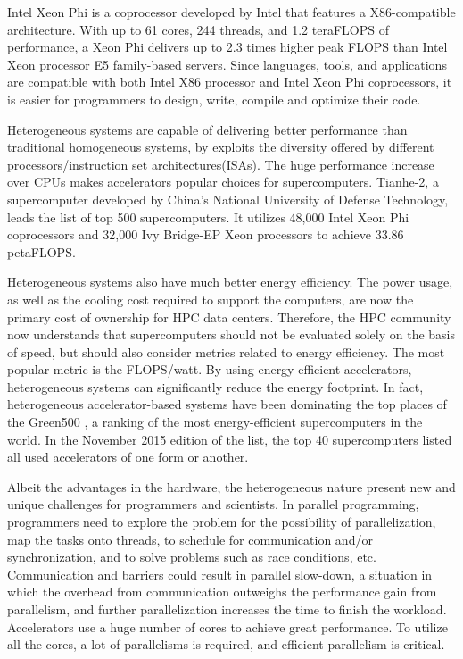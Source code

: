 Intel Xeon Phi\cite{Jeffers:2013:IXP:2523262} is a coprocessor developed by Intel that features a 
X86-compatible architecture. With up to 61 cores, 244 threads, 
and 1.2 teraFLOPS of performance, a Xeon Phi delivers up to 2.3 times higher 
peak FLOPS than Intel Xeon processor E5 family-based servers.
Since languages, tools, and applications are compatible with both Intel X86 
processor and Intel Xeon Phi coprocessors, it is easier for programmers to
design, write, compile and optimize their code. 




Heterogeneous systems are capable of delivering better performance than 
traditional homogeneous systems, by exploits the diversity offered by different 
processors/instruction set architectures(ISAs). 
The huge performance increase over CPUs makes accelerators popular choices for
supercomputers. Tianhe-2\cite{Liao2014}, a supercomputer developed by China’s National 
University of Defense Technology, leads the list of top 500 supercomputers\cite{top500-2015-11}.
It utilizes 48,000  Intel Xeon Phi coprocessors and 32,000 Ivy Bridge-EP Xeon 
processors to achieve 33.86 petaFLOPS.

Heterogeneous systems also have much better energy efficiency. 
The power usage, as well as the cooling cost required to support the computers,
are now the primary cost of ownership for HPC data centers. Therefore,
the HPC community now understands that supercomputers should not be evaluated
solely on the basis of speed, but should also consider metrics related to 
energy efficiency. The most popular metric is the FLOPS/watt.
By using energy-efficient accelerators,
heterogeneous systems can significantly reduce the energy footprint. 
In fact, heterogeneous accelerator-based systems have been dominating the 
top places of the Green500 \cite{green500},
a ranking of the most energy-efficient supercomputers in the world. 
In the November 2015 edition of the list\cite{green500-2015-11}, 
the top 40 supercomputers listed all used accelerators of one form or another.

Albeit the advantages in the hardware, the heterogeneous nature present new
and unique challenges for programmers and scientists. 
In parallel programming, programmers need to explore the problem for the
possibility of parallelization, map the tasks onto threads, to schedule for
communication and/or synchronization, and to solve problems such as race conditions,
etc. Communication and barriers could result in parallel slow-down, 
a situation in which the overhead from communication outweighs the performance 
gain from parallelism, and further parallelization increases the time to finish
the workload. 
Accelerators use a huge number of cores to achieve great performance. 
To utilize all the cores, a lot of parallelisms is required, and efficient 
parallelism is critical. 

